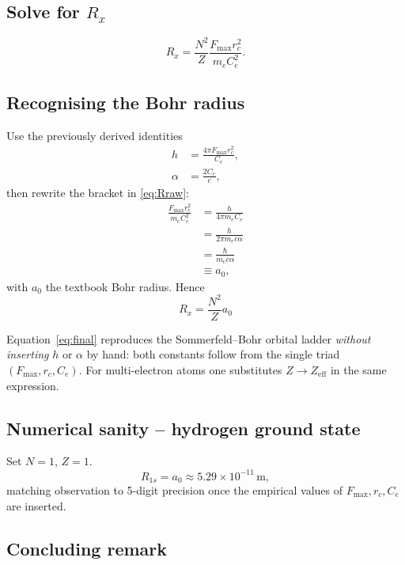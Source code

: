 \documentclass[a4paper,12pt]{article}
\begin{document}
\subsection{Solve for $R_x$}

\begin{equation}
    R_x = \frac{N^{2}}{Z} \frac{F_{\max} r_c^{2}}{m_e C_e^{2}}.
\label{eq:Rraw}
\end{equation}

\subsection{Recognising the Bohr radius}

Use the previously derived identities
\begin{align}
    h &= \frac{4\pi F_{\max} r_c^{2}}{C_e}, \tag{A} \\
\alpha &= \frac{2C_e}{c},\tag{B}
\end{align}
then rewrite the bracket in \eqref{eq:Rraw}:
\begin{align*}
\frac{F_{\max}r_c^{2}}{m_eC_e^{2}}
    &= \frac{h}{4\pi m_e C_e} \\
    &= \frac{h}{2\pi m_e c \alpha} \\
    &= \frac{\hbar}{m_e c \alpha} \\
    &\equiv a_0,
\end{align*}
with $a_0$ the textbook Bohr radius.  Hence
\begin{equation}
    \boxed{R_x = \frac{N^{2}}{Z} a_0}
\label{eq:final}
\end{equation}

Equation~\eqref{eq:final} reproduces the Sommerfeld--Bohr orbital ladder \textit{without inserting} $h$ or $\alpha$ by hand: both constants follow from the single triad $(F_{\max}, r_c, C_e)$. For multi-electron atoms one substitutes $Z \rightarrow Z_{\text{eff}}$ in the same expression.

\subsection{Numerical sanity -- hydrogen ground state}

Set $N=1$, $Z=1$.
\[
    R_{1s} = a_0 \approx 5.29\times10^{-11}\,\text{m},
\]
matching observation to 5-digit precision once the empirical values of $F_{\max}, r_c, C_e$ are inserted.

\subsection{Concluding remark}
\end{document}
